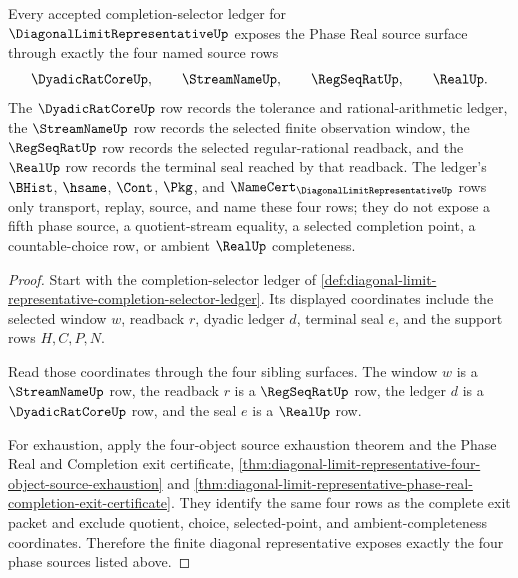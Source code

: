 \begin{theorem}
\label{thm:diagonal-limit-representative-phase-source-coverage}
Every accepted completion-selector ledger for $\DiagonalLimitRepresentativeUp$ exposes the Phase Real source surface through exactly the four named source rows
$$
\DyadicRatCoreUp,\qquad \StreamNameUp,\qquad \RegSeqRatUp,\qquad \RealUp.
$$
The $\DyadicRatCoreUp$ row records the tolerance and rational-arithmetic ledger, the $\StreamNameUp$ row records the selected finite observation window, the $\RegSeqRatUp$ row records the selected regular-rational readback, and the $\RealUp$ row records the terminal seal reached by that readback. The ledger's $\BHist$, $\hsame$, $\Cont$, $\Pkg$, and $\NameCert_{\DiagonalLimitRepresentativeUp}$ rows only transport, replay, source, and name these four rows; they do not expose a fifth phase source, a quotient-stream equality, a selected completion point, a countable-choice row, or ambient $\RealUp$ completeness.
\end{theorem}
\begin{proof}
Start with the completion-selector ledger of \autoref{def:diagonal-limit-representative-completion-selector-ledger}. Its displayed coordinates include the selected window $w$, readback $r$, dyadic ledger $d$, terminal seal $e$, and the support rows $H,C,P,N$.

Read those coordinates through the four sibling surfaces. The window $w$ is a $\StreamNameUp$ row, the readback $r$ is a $\RegSeqRatUp$ row, the ledger $d$ is a $\DyadicRatCoreUp$ row, and the seal $e$ is a $\RealUp$ row.

For exhaustion, apply the four-object source exhaustion theorem and the Phase Real and Completion exit certificate, \autoref{thm:diagonal-limit-representative-four-object-source-exhaustion} and \autoref{thm:diagonal-limit-representative-phase-real-completion-exit-certificate}. They identify the same four rows as the complete exit packet and exclude quotient, choice, selected-point, and ambient-completeness coordinates. Therefore the finite diagonal representative exposes exactly the four phase sources listed above.
\end{proof}

